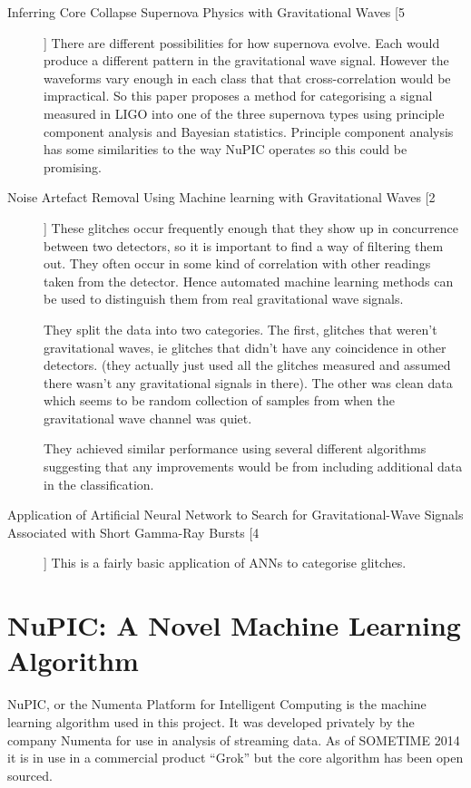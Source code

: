 \documentclass[a4paper]{jpconf}
\begin{document}
\begin{description}
\item[Inferring Core Collapse Supernova Physics with Gravitational Waves [5]]
There are different possibilities for how supernova evolve. Each would produce a different pattern in the gravitational wave signal. However the waveforms vary enough in each class that that cross-correlation would be impractical. So this paper proposes a method for categorising a signal measured in LIGO into one of the three supernova types using principle component analysis and Bayesian statistics. Principle component analysis has some similarities to the way NuPIC operates so this could be promising.

\item[Noise Artefact Removal Using Machine learning with Gravitational Waves [2]]
These glitches occur frequently enough that they show up in concurrence between two detectors, so it is important to find a way of filtering them out. They often occur in some kind of correlation with other readings taken from the detector. Hence automated machine learning methods can be used to distinguish them from real gravitational wave signals.

They split the data into two categories. The first, glitches that weren't gravitational waves, ie glitches that didn't have any coincidence in other detectors. (they actually just used all the glitches measured and assumed there wasn't any gravitational signals in there). The other was clean data which seems to be random collection of samples from when the gravitational wave channel was quiet.

They achieved similar performance using several different algorithms suggesting that any improvements would be from including additional data in the classification.

\item[Application of Artificial Neural Network to Search for Gravitational-Wave Signals Associated with Short Gamma-Ray Bursts [4]]
This is a fairly basic application of ANNs to categorise glitches.
\end{description}

\section{NuPIC: A Novel Machine Learning Algorithm}%
	NuPIC, or the Numenta Platform for Intelligent Computing is the machine learning algorithm used in this project. It was developed privately by the company Numenta for use in analysis of streaming data. As of SOMETIME 2014 it is in use in a commercial product ``Grok'' but the core algorithm has been open sourced.
		
\end{document}
